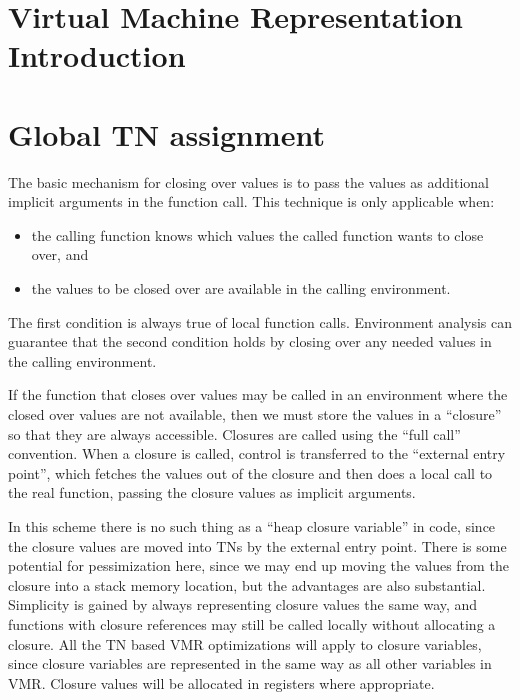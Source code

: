 

\chapter{Virtual Machine Representation Introduction}


\chapter{Global TN assignment}


The basic mechanism for closing over values is to pass the values as additional
implicit arguments in the function call.  This technique is only applicable
when:

\begin{itemize}
\item the calling function knows which values the called function wants to close
    over, and
\item the values to be closed over are available in the calling
  environment.
\end{itemize}

The first condition is always true of local function calls.  Environment
analysis can guarantee that the second condition holds by closing over any
needed values in the calling environment.

If the function that closes over values may be called in an environment where
the closed over values are not available, then we must store the values in a
``closure'' so that they are always accessible.  Closures are called using the
``full call'' convention.  When a closure is called, control is transferred to
the ``external entry point'', which fetches the values out of the closure and
then does a local call to the real function, passing the closure values as
implicit arguments.

In this scheme there is no such thing as a ``heap closure variable'' in code,
since the closure values are moved into TNs by the external entry point.  There
is some potential for pessimization here, since we may end up moving the values
from the closure into a stack memory location, but the advantages are also
substantial.  Simplicity is gained by always representing closure values the
same way, and functions with closure references may still be called locally
without allocating a closure.  All the TN based VMR optimizations will apply
to closure variables, since closure variables are represented in the same way
as all other variables in VMR.  Closure values will be allocated in registers
where appropriate.

